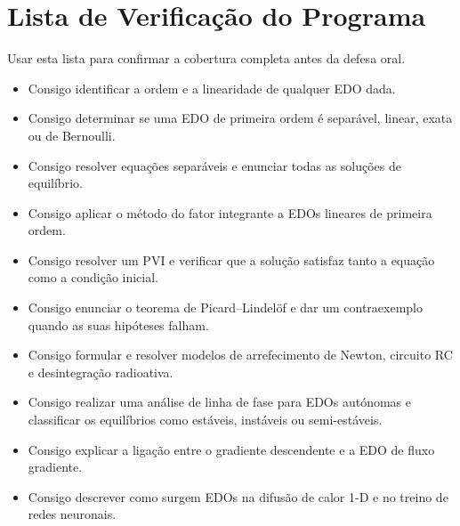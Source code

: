 \documentclass[12pt, a4paper]{article}
\begin{document}
\section{Lista de Verificação do Programa}
\label{sec:checklist}

\begin{tcolorbox}[
  colback=soft, colframe=primary,
  title={\textbf{Lista de Competências}},
  fonttitle=\bfseries\color{white},
  attach boxed title to top left={yshift=-2mm, xshift=4mm},
  boxed title style={colback=primary, rounded corners, size=small}
]
  Usar esta lista para confirmar a cobertura completa antes da defesa oral.

  \begin{itemize}[label=\textcolor{primary}{$\square$}, leftmargin=1.5em]
    \item Consigo identificar a ordem e a linearidade de qualquer EDO dada.
    \item Consigo determinar se uma EDO de primeira ordem é separável, linear, exata ou
          de Bernoulli.
    \item Consigo resolver equações separáveis e enunciar todas as soluções de equilíbrio.
    \item Consigo aplicar o método do fator integrante a EDOs lineares de primeira ordem.
    \item Consigo resolver um PVI e verificar que a solução satisfaz tanto a equação como
          a condição inicial.
    \item Consigo enunciar o teorema de Picard--Lindel\"of e dar um contraexemplo quando
          as suas hipóteses falham.
    \item Consigo formular e resolver modelos de arrefecimento de Newton, circuito RC e
          desintegração radioativa.
    \item Consigo realizar uma análise de linha de fase para EDOs autónomas e classificar
          os equilíbrios como estáveis, instáveis ou semi-estáveis.
    \item Consigo explicar a ligação entre o gradiente descendente e a EDO de fluxo
          gradiente.
    \item Consigo descrever como surgem EDOs na difusão de calor 1-D e no treino de redes
          neuronais.
  \end{itemize}
\end{tcolorbox}

\end{document}
